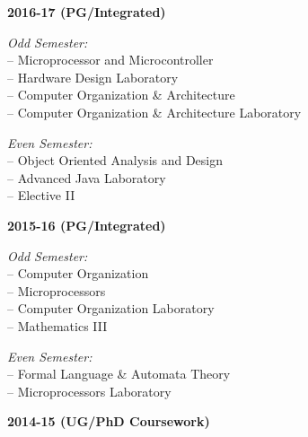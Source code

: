 \documentclass[11pt,a4paper]{moderncv}
\begin{document}
\begin{adjustwidth}{6em}{0pt}
	
	\textbf{2016-17 (PG/Integrated)}
	
	\begin{adjustwidth}{2em}{0pt}
		\textit{Odd Semester:} \\
		\hspace*{1.5em}-- Microprocessor and Microcontroller \\
		\hspace*{1.5em}-- Hardware Design Laboratory \\
		\hspace*{1.5em}-- Computer Organization \& Architecture \\
		\hspace*{1.5em}-- Computer Organization \& Architecture Laboratory 
		
		\textit{Even Semester:} \\
		\hspace*{1.5em}-- Object Oriented Analysis and Design \\
		\hspace*{1.5em}-- Advanced Java Laboratory \\
		\hspace*{1.5em}-- Elective II \\
	\end{adjustwidth}
	

	
	\textbf{2015-16 (PG/Integrated)}
	
	\begin{adjustwidth}{2em}{0pt}
		\textit{Odd Semester:} \\
		\hspace*{1.5em}-- Computer Organization \\
		\hspace*{1.5em}-- Microprocessors \\
		\hspace*{1.5em}-- Computer Organization Laboratory \\
		\hspace*{1.5em}-- Mathematics III 
		
		\textit{Even Semester:} \\
		\hspace*{1.5em}-- Formal Language \& Automata Theory \\
		\hspace*{1.5em}-- Microprocessors Laboratory \\
	\end{adjustwidth}
	

	
	\textbf{2014-15 (UG/PhD Coursework)}
	

\end{adjustwidth}
\end{document}
